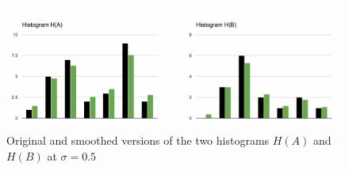 \begin{figure}[h]
\centering
\includegraphics[width=450]{images/smoothed_a_b.pdf}
\caption{Original and smoothed versions of the two histograms $H(A)$ and $H(B)$ at $\sigma = 0.5$}
\label{fig:smoothed_a_b}
\end{figure}

